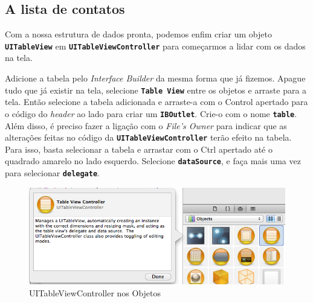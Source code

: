 \documentclass[a4paper,12pt,brazil,doubleside]{book}
\begin{document}
\begin{singlespace}
\subsection{A lista de contatos}


Com a nossa estrutura de dados pronta, podemos enfim criar um objeto \texttt{\textbf{UITableView}} em \texttt{\textbf{UITableViewController}} para começarmos a lidar com os dados na tela.

Adicione a tabela pelo \emph{Interface Builder} da mesma forma que já fizemos. Apague tudo que já existir na tela, selecione \texttt{\textbf{Table View}} entre os objetos e arraste para a tela. Então selecione a tabela adicionada e arraste-a com o Control apertado para o código do \emph{header} ao lado para criar um \texttt{\textbf{IBOutlet}}. Crie-o com o nome \texttt{\textbf{table}}. Além disso, é preciso fazer a ligação com o \emph{File's Owner} para indicar que as alterações feitas no código da \texttt{\textbf{UITableViewController}} terão efeito na tabela. Para isso, basta selecionar a tabela e arrastar com o Ctrl apertado até o quadrado amarelo no lado esquerdo. Selecione \texttt{\textbf{dataSource}}, e faça mais uma vez para selecionar \texttt{\textbf{delegate}}.

\bigskip
\bigskip

\begin{figure}[H]
  \centering
  \includegraphics[width=.75\textwidth]{figuras/table/table8.png}
  \caption{UITableViewController nos Objetos}
  \label{fig:a}
\end{figure}

\bigskip


\end{singlespace}
\end{document}
